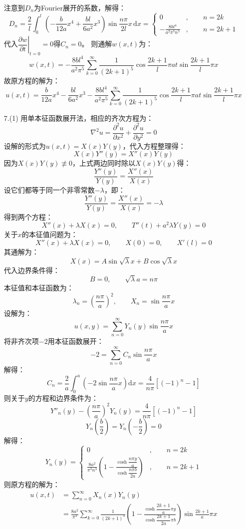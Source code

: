 \documentclass[a4paper,fontset=windows]{ctexart}
\begin{document}
\begin{itemize}
\[    \]
    注意到$D_n$为Fourier展开的系数，解得：
    \[
    D_n = \frac{2}{l}\int_0^l\left(-\frac{b}{12a}x^4 + \frac{bl}{6a^2}x^3\right)\sin\frac{n\pi}{2l}x \,\mathrm{d}x = \left\{
    \begin{aligned}
        0\qquad &,\qquad n = 2k \\
        -\frac{8bl^4}{a^2 \pi^5 n^5}&,\qquad n = 2k + 1
    \end{aligned}
    \right.
    \]
    代入$\left.\dfrac{\partial w}{\partial t}\right|_{t=0} = 0$得$C_n = 0$。
    则通解$w(x,t)$为：
    \[
    w(x,t) = -\frac{8bl^4}{a^2\pi^5}\sum_{k=0}^{\infty}\frac{1}{(2k+1)^5}\cos\frac{2k+1}{l}\pi at\sin\frac{2k+1}{l}\pi x
    \]
    故原方程的解为：
    \[
    u(x,t) = \frac{b}{12a}x^4 - \frac{bl}{6a^2}x^3 - \frac{8bl^4}{a^2\pi^5}\sum_{k=0}^{\infty}\frac{1}{(2k+1)^5}\cos\frac{2k+1}{l}\pi at\sin\frac{2k+1}{l}\pi x
    \]
    \bigskip

    \item[7.(1)]
    用单本征函数展开法，相应的齐次方程为：
    \[
    \nabla^2 u = \frac{\partial^2 u}{\partial x^2} + \frac{\partial^2 u}{\partial y^2} = 0
    \]
    设解的形式为$u(x,t) = X(x)Y(y)$，代入方程整理得：
    \[
    X(x)Y''(y) = X''(x)Y(y)
    \]
    因为$X(x)Y(y) \not\equiv 0$，上式两边同时除以$X(x)Y(y)$得：
    \[
    \frac{Y''(y)}{Y(y)} = \frac{X''(x)}{X(x)}
    \]
    设它们都等于同一个非零常数$-\lambda$，即：
    \[
    \frac{Y''(y)}{Y(y)} = \frac{X''(x)}{X(x)} = -\lambda
    \]
    得到两个方程：
    \[
    X''(x) + \lambda X(x) = 0,\qquad T''(t) + a^2\lambda Y(y) = 0
    \]
    关于$x$的本征值问题为：
    \[
    X''(x) + \lambda X(x) = 0,\qquad X(0) = 0,\qquad X'(l) = 0
    \]
    其通解为：
    \[
    X(x) = A\sin\sqrt{\lambda} x + B\cos\sqrt{\lambda} x
    \]
    代入边界条件得：
    \[
    B = 0,\qquad \sqrt{\lambda} a = n\pi
    \]
    本征值和本征函数为：
    \[
    \lambda_n = \left(\frac{n\pi}{a}\right)^2,\qquad X_n = \sin\frac{n\pi}{a}x
    \]
    设解为：
    \[
    u(x,y) = \sum_{n=0}^{\infty}Y_n(y)\sin\frac{n\pi}{a}x
    \]
    将非齐次项$-2$用本征函数展开：
    \[
    -2 = \sum_{n=0}^{\infty}C_n\sin\frac{n\pi}{a}x
    \]
    解得：
    \[
    C_n = \frac{2}{a}\int_0^a \left(-2\sin\frac{n\pi}{a}x\right)\mathrm{d}x = \frac{4}{n\pi}\left[(-1)^n - 1\right]
    \]
    则关于$y$的方程和边界条件为：
    \[
    Y''_n(y) - \left(\frac{n\pi}{a}\right)^2 Y_n(y) = \frac{4}{n\pi}\left[(-1)^n - 1\right]
    \]
    \[
    Y_n(\frac{b}{2}) = Y_n(-\frac{b}{2}) = 0
    \]
    解得：
    \[
    Y_n(y) = \left\{
    \begin{aligned}
        0\qquad\qquad\quad &,\qquad n = 2k \\
        \frac{8a^2}{\pi^3 n^3}\left(1 - \frac{\cosh\dfrac{n\pi y}{a}}{\cosh\dfrac{n\pi b}{2a}}\right) &,\qquad n = 2k + 1
    \end{aligned}
    \right.
    \]
    则原方程的解为：
    \begin{align*}
    u(x,t)
    &= \sum_{n=0}^\infty X_n(x)Y_n(y) \\
    &= \frac{8a^2}{\pi^3}\sum_{k=0}^\infty \frac{1}{(2k+1)^3}\left(1 - \frac{\cosh\dfrac{2k+1}{a}\pi y}{\cosh\dfrac{2k+1}{2a}\pi b}\right)\sin\frac{2k+1}{a}\pi x
    \end{align*}
    \bigskip


\end{itemize}
\end{document}
